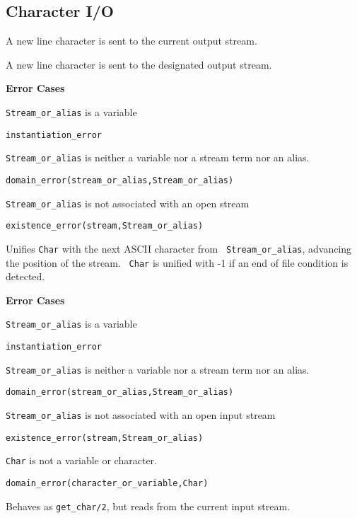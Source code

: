 \subsection{Character I/O}
\begin{description}

A new line character is sent to the current output stream.

A new line character is sent to the designated output stream.

{\bf Error Cases}
\bi
\item 	{\tt Stream\_or\_alias} is a variable
\bi
\item {\tt instantiation\_error}
\ei
\item 	{\tt Stream\_or\_alias} is neither a variable nor a stream term nor an alias.
\bi
\item 	{\tt domain\_error(stream\_or\_alias,Stream\_or\_alias)}
\ei
\item 	{\tt Stream\_or\_alias} is not associated with an open stream
\bi
\item 	{\tt existence\_error(stream,Stream\_or\_alias)}
\ei
\ei


   Unifies {\tt Char} with the next ASCII character from {\tt
   Stream\_or\_alias}, advancing the position of the stream.  {\tt
   Char} is unified with -1 if an end of file condition is detected.

{\bf Error Cases}
\bi
\item 	{\tt Stream\_or\_alias} is a variable
\bi
\item {\tt instantiation\_error}
\ei
\item 	{\tt Stream\_or\_alias} is neither a variable nor a stream term nor an alias.
\bi
\item 	{\tt domain\_error(stream\_or\_alias,Stream\_or\_alias)}
\ei
\item 	{\tt Stream\_or\_alias} is not associated with an open input stream
\bi
\item 	{\tt existence\_error(stream,Stream\_or\_alias)}
\ei
\item 	{\tt Char} is not a variable or character.
\bi
\item 	{\tt domain\_error(character\_or\_variable,Char)}
\ei
\ei

%
Behaves as {\tt get\_char/2}, but reads from the current input stream.


\end{description}
